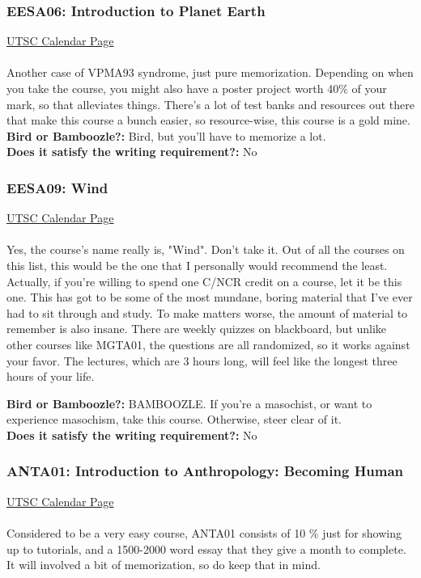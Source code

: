 \documentclass[11pt]{article}
\begin{document}
\subsubsection{EESA06: Introduction to Planet Earth}
\href{https://utsc.calendar.utoronto.ca/course/EESA06H3}{UTSC Calendar Page}\\\\
Another case of VPMA93 syndrome, just pure memorization.  Depending on when you take the course, you might also have a poster project worth 40$\%$ of your mark, so that alleviates things.  There's a lot of test banks and resources out there that make this course a bunch easier, so resource-wise, this course is a gold mine.
\\
\textbf{Bird or Bamboozle?:} Bird, but you'll have to memorize a lot.\\

\textbf{Does it satisfy the writing requirement?:} No

\subsubsection{EESA09: Wind}
\href{https://utsc.calendar.utoronto.ca/course/EESA09H3}{UTSC Calendar Page}\\\\
Yes, the course's name really is, "Wind".  Don't take it.  Out of all the courses on this list, this would be the one that I personally would recommend the least.  Actually, if you're willing to spend one C/NCR credit on a course, let it be this one.  This has got to be some of the most mundane, boring material that I've ever had to sit through and study.  To make matters worse, the amount of material to remember is also insane.  There are weekly quizzes on blackboard, but unlike other courses like MGTA01, the questions are all randomized, so it works against your favor.  The lectures, which are 3 hours long, will feel like the longest three hours of your life.

\textbf{Bird or Bamboozle?:} BAMBOOZLE.  If you're a masochist, or want to experience masochism, take this course.  Otherwise, steer clear of it.\\

\textbf{Does it satisfy the writing requirement?:} No

\subsubsection{ANTA01: Introduction to Anthropology: Becoming Human}
\href{https://utsc.calendar.utoronto.ca/course/ANTA01H3}{UTSC Calendar Page}\\\\
Considered to be a very easy course, ANTA01 consists of 10 \% just for showing up to tutorials, and a 1500-2000 word essay that they give  a month to complete.  It will involved a bit of memorization, so do keep that in mind.\\
\end{document}
